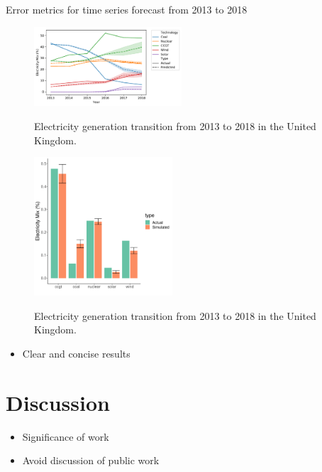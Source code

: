 \documentclass[final,3p,times,twocolumn,numbers]{elsarticle}
\begin{document}
\begin{table}[htb]
    \centering
{}
    \caption{Error metrics for time series forecast from 2013 to 2018}\label{table:metrics}
\end{table}


\begin{figure}
\centering
\includegraphics[width=0.49\textwidth]{figures/results/throughout_years.pdf}
\label{uk_historical_mix}
\caption{Electricity generation transition from 2013 to 2018 in the United Kingdom.}
\end{figure}


\begin{figure}
\centering
\includegraphics[width=0.46\textwidth]{figures/results/best_run.pdf}
\label{uk_historical_mix}
\caption{Electricity generation transition from 2013 to 2018 in the United Kingdom.}
\end{figure}

\begin{itemize}
	\item Clear and concise results
\end{itemize}

\section{Discussion}
\label{sec:discussion}

\begin{itemize}
	\item Significance of work
	\item Avoid discussion of public work
\end{itemize}
\end{document}
